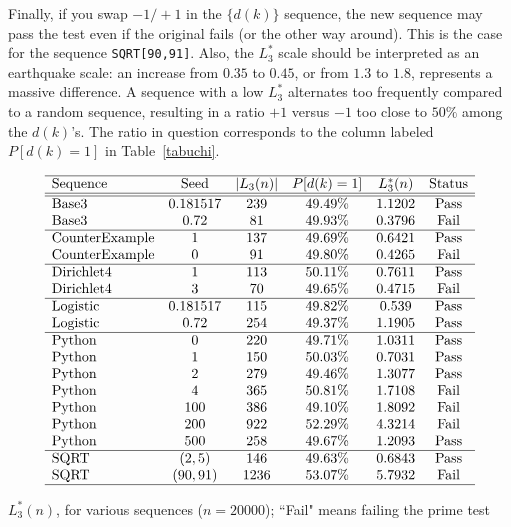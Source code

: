 \documentclass[oneside,10pt]{book}
\begin{document}
Finally, if you swap $-1 / +1$ in the $\{d(k)\}$ sequence, the new sequence may pass the test even if the original fails (or the other way around). This is the case for the sequence \texttt{SQRT[90,91]}. Also, the $L^*_3$ scale should be interpreted as an earthquake scale: an increase from $0.35$ to $0.45$, or from $1.3$ to $1.8$, represents a massive difference. A sequence with a low $L^*_3$ alternates too frequently compared to a random
sequence, resulting in a ratio $+1$ versus $-1$ too close to $50\%$ among the $d(k)$'s. The ratio in question corresponds to the 
 column labeled $P[d(k)=1]$ in Table~\ref{tabuchi}.



\begin{table}%
\[
\begin{array}{lccccc}
\hline
\text{Sequence}	& \text{Seed}&	|L_3(n)|&	P[d(k)=1]&	L^*_3(n) & \text{Status}\\
\hline
\hline
\text{Base3} & 0.181517&239&49.49\%&1.1202 & \text{Pass}\\	
\text{Base3} & 0.72&81&49.93\%&0.3796 & \text{Fail}\\	
\hline
\text{CounterExample} & 1&137&49.69\%&0.6421 &  \text{Pass}\\	
\text{CounterExample} & 0&91&49.80\%&0.4265 &  \text{Fail}\\	
\hline
\text{Dirichlet4} & 1&113&50.11\%&0.7611 &  \text{Pass}\\	
\text{Dirichlet4} & 3&70&49.65\%&0.4715 &  \text{Fail}\\	
\hline
\text{Logistic} & 0.181517&115&49.82\%&0.539 &  \text{Pass}\\	
\text{Logistic} & 0.72&254&49.37\%&1.1905 &  \text{Pass}\\
\hline	
\text{Python} & 0&220&49.71\%&1.0311 &  \text{Pass}\\	
\text{Python} & 1&150&50.03\%&0.7031 &  \text{Pass}\\	
\text{Python} & 2&279&49.46\%&1.3077 &  \text{Pass}\\	
\text{Python} & 4&365&50.81\%&1.7108 & \text{Fail} \\	
\text{Python} & 100&386&49.10\%&1.8092 &  \text{Fail}\\	
\text{Python} & 200&922&52.29\%&4.3214 &  \text{Fail}\\	
\text{Python} & 500&258&49.67\%&1.2093 &  \text{Pass}\\	
\hline
\text{SQRT} & (2, 5)&146&49.63\%&0.6843 &  \text{Pass}\\	
\text{SQRT} & (90, 91)&1236&53.07\%&5.7932 & \text{Fail} \\
\hline
\end{array}
\]
\caption{\label{tabuchi} $L^*_3(n)$, for various sequences ($n=\num{20000}$); ``Fail" means failing the prime test}
\end{table}
\end{document}
